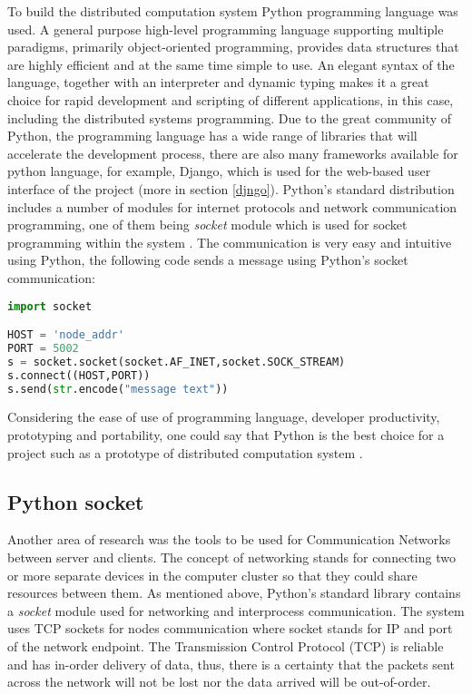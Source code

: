\documentclass[10pt]{report}
\begin{document}
To build the distributed computation system Python programming language was used. A general purpose high-level programming language supporting multiple paradigms, primarily object-oriented programming, provides data structures that are highly efficient and at the same time simple to use. An elegant syntax of the language, together with an interpreter and dynamic typing makes it a great choice for rapid development and scripting of different applications, in this case, including the distributed systems programming. Due to the great community of Python, the programming language has a wide range of libraries that will accelerate the development process, there are also many frameworks available for python language, for example, Django, which is used for the web-based user interface of the project (more in section \ref{djngo}). Python's standard distribution includes a number of modules for internet protocols and network communication programming, one of them being \textit{socket} module which is used for socket programming within the system \cite{socket, sockethowto}. The communication is very easy and intuitive using Python, the following code sends a message using Python's socket communication:

\begin{lstlisting}[language=Python]
import socket

HOST = 'node_addr'
PORT = 5002
s = socket.socket(socket.AF_INET,socket.SOCK_STREAM)
s.connect((HOST,PORT))
s.send(str.encode("message text"))
\end{lstlisting}

Considering the ease of use of programming language, developer productivity, prototyping and portability, one could say that Python is the best choice for a project such as a prototype of distributed computation system \cite{pyeff}.

\subsection{Python socket}

Another area of research was the tools to be used for Communication Networks between server and clients. The concept of networking stands for connecting two or more separate devices in the computer cluster so that they could share resources between them. As mentioned above, Python's standard library contains a \textit{socket} module used for networking and interprocess communication. The system uses TCP sockets for nodes communication where socket stands for IP and port of the network endpoint. The Transmission Control Protocol (TCP) is reliable and has in-order delivery of data, thus, there is a certainty that the packets sent across the network will not be lost nor the data arrived will be out-of-order.
\newline
\end{document}
